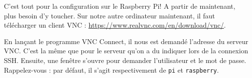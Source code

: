 C'est tout pour la configuration sur le Raspberry Pi! A partir de maintenant, plus besoin d'y toucher. Sur notre autre ordinateur maintenant, il faut télécharger un client VNC : \url{https://www.realvnc.com/en/download/vnc/}.

En lançant le programme VNC Connect, il nous est demandé l'adresse du serveur VNC. C'est la même que pour le serveur qu'on a du indiquer lors de la connexion SSH. Ensuite, une fenêtre s'ouvre pour demander l'utilisateur et le mot de passe. Rappelez-vous : par défaut, il s'agit respectivement de \texttt{pi} et \texttt{raspberry}.